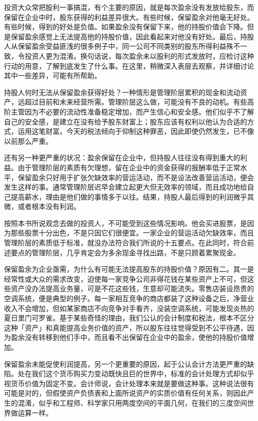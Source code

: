 \documentclass[UTF8,a4paper,zihao=-4,fontset = windows]{ctexart} %
\begin{document}
投资大众常把股利一事搞混，有个主要的原因，就是每次盈余没有发放给股东，而保留在企业中时，股东获得的利益差异很大。有些时候，保留盈余对他毫无好处。有些时候，得到的好处是负值。如果盈余没有保留下来，他的持股价值会下降。但是保留盈余感觉上无法提高他的持股价值，因此看起来对他没有好处。最后，持股人从保留盈余受益匪浅的很多例子中，同一公司不同类别的股东所得利益殊不一致，令投资人更为混淆。换句话说，每次盈余未以股利的形式发放时，应检讨这种行动的用意，了解到底发生了什么事。在这里，稍微深入表层去观察，并详细讨论其中一些差异，可能有所帮助。

持股人何时无法从保留盈余获得好处？一种情形是管理阶层累积的现金和流动资产，远超过目前和未来经营所需。管理阶层这么做，可能没有不良的动机。有些高阶主管因为不必要的流动性准备稳定增加，而产生信心和安全感。他们似乎不了解自己的安全感，是建立在没有给予股东财富上；股东应该有权利以他认为合适的方式，运用这笔财富。今天的税法倾向于仰制这种罪恶，因此即使仍然发生，已不像以前那么严重。

还有另一种更严重的状况：盈余保留在企业中，但持股人往往没有得到重大的利益。由于管理阶层的素质有欠理想，留在企业中的资金获得的报酬率低于正常水平，保留盈余只好用于扩张欠缺效率的营运活动，而不是设法改善营运活动，便会发生这样的事。通常管理阶层迟早会建立起更大但无效率的领域，而且成功地给自己提高薪水，理由是他们做的事情多于以往。结果，持股人最后得到的利润微乎其微，或者根本没有利润。

按照本书所说观念去做的投资人，不可能受到这些情况影响。他会买进股票，是因为那些股票十分出色，不是只因它们很便宜。一家企业的营运活动欠缺效率，而且管理阶层的素质低于标准，就没办法符合我们所说的十五要点。在此同时，符合前述要点的管理阶层，几乎肯定会为多余现金寻找出路，不是只顾着累聚现金。

保留盈余为企业亟需，为什么有可能无法提高股东的持股价值？原因有二。其一是经常性或大众的需求改变，迫使每一家竞争公司非得花钱在某些资产上不可，但这些资产没办法提高业务量，可是不花这些钱，生意却可能流失。零售店装设昂贵的空调系统，便是典型的例子。每一家相互竞争的商店都装了这种设备之后，净营业收入不会增加，但如某家商店不向竞争对手看齐，没装空调系统，可能发现炎热的夏日里门可罗雀。基于某些奇怪的理由，我们公认的会计制度和税法，根本不区分这种「资产」和真能提高业务价值的资产，所以股东往往觉得受到不公平待遇，因为盈余没有转移到他们手中，而且看不出保留在企业中的盈余，使他的持股价值增加。

保留盈余未能促使利润提高，另一个更重要的原因，起于公认会计方法更严重的缺陷。处在我们这个货币购买力变动既快且巨的世界中，标准的会计处理方式却似乎视货币价值为固定不变。会计师说，会计处理本来就是要做这种事。这种说法很有可能是对的，但假使资产负债表和上面所说资产的实质价值有任何关系，则因此产生的混淆，似乎和工程师、科学家只用两度空间的平面几何，在我们的三度空间世界做运算一样。
\end{document}
